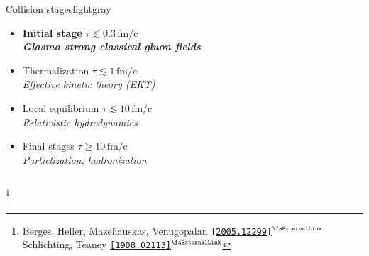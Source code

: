\documentclass[aspectratio=169,11pt,usenames,dvipsnames]{beamer}
\renewcommand{\thefootnote}{\color{customblue}\faPaperPlaneO}
\newcommand\blfootnote[1]{%
  \begingroup
  \renewcommand\thefootnote{}\footnote{#1}%
  \addtocounter{footnote}{-1}%
  \endgroup
}
\begin{document}
\begin{frame}
\begin{columns}[onlytextwidth,t]
\begin{center}
\begin{custombox2}{\color{normal}Collision stages}{lightgray}
\begin{varwidth}{0.8\textwidth}
\begin{itemize}
                        {\color{lightgray}\scriptsize\itshape Gluon field of high-energy nucleus}
                     \item {{\bfseries\color{palviolet} Initial stage} {\scriptsize $\tau\lesssim
                    0.3\,\mathrm{fm/c}$}}\\[1pt]
                        {\color{lightgray}\scriptsize\itshape {\bfseries\color{palviolet}Glasma strong classical gluon fields}}
                     \item Thermalization {\scriptsize$\tau\lesssim
                    1\,\mathrm{fm/c}$}\\[1pt] 
                        {\color{lightgray}\scriptsize\itshape Effective kinetic theory (EKT)} 
                    \item Local equilibrium {\scriptsize $\tau\lesssim 10\,\mathrm{fm/c}$}\\[1pt]
                    {\color{lightgray}\scriptsize\itshape Relativistic hydrodynamics} 
                    \item Final stages {\scriptsize $\tau\geq 10\,\mathrm{fm/c}$}\\[1pt]
                    {\color{lightgray}\scriptsize\itshape Particlization, hadronization}
                \end{itemize}
                \end{varwidth}
            \end{custombox2}
            \end{center}
    \end{columns}
    \blfootnote{\scriptsize Berges, Heller, Mazeliauskas, Venugopalan \href{https://arxiv.org/abs/2005.12299}{{\color{palgold}\texttt{[2005.12299]$^\text{\scalebox{0.9}{\faExternalLink}}$}}} Schlichting, Teaney \href{https://arxiv.org/abs/1908.02113}{{\color{palgold}\texttt{[1908.02113]$^\text{\scalebox{0.9}{\faExternalLink}}$}}}}
\end{frame}
\end{document}
